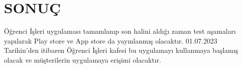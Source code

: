 \chapter{SONUÇ}\label{ch:ifnecch4}
Öğrenci İşleri uygulaması tamamlanıp son halini aldığı zaman test aşamaları yapılarak Play store ve App store da yayınlanmış olacaktır. 01.07.2023 Tarihin'den itibaren Öğrenci İşleri kafesi bu uygulamayı kullanmaya başlamış olacak ve müşterilerin uygulamaya erişimi olacaktır.